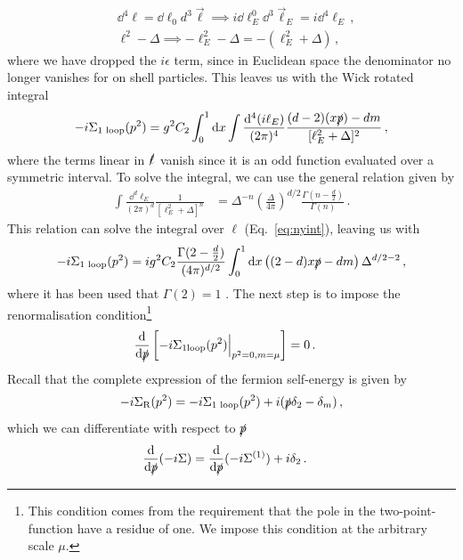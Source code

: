 \begin{align}
    &\dd^4\ell = \dd\ell_0 d^3\vec{\ell} \implies i \dd\ell_E^0 \dd^3\vec{\ell}_E = i \dd^4\ell_E\,,\\
    &\ell^2 - \Delta \implies -\ell_E^2 - \Delta = -(\ell_E^2 + \Delta) \,,
\end{align}
where we have dropped the $i\epsilon$ term, since in Euclidean space the denominator no longer vanishes for on shell particles. This leaves us with the Wick rotated integral
\begin{align}
    -i \Sigma_{\text{1 loop}}(p^2)= g^2 C_2 \int_0^1 \mathrm{d} x \int \frac{\mathrm{d}^4(i\ell_E)}{(2\pi)^4} \frac{(d-2)(x\slashed{p}) - dm}{[\ell_E^2 + \Delta]^2}\,,\label{eq:nyint}
\end{align}
where the terms linear in $\slashed{\ell}$ vanish since it is an odd function evaluated over a symmetric interval. To solve the integral, we can use the general relation \cite{Peskin:1995ev} given by
\begin{align}
    \int \frac{\dd^d \ell_E}{(2\pi)^d} \frac{1}{[\ell_E^2 + \Delta]^n} &= \Delta^{-n} \left(\frac{\Delta}{4\pi}\right)^{d/2} \frac{\Gamma(n - \frac{d}{2})}{\Gamma(n)}\,.
\end{align}
This relation can solve the integral over $\ell$ (Eq.~\eqref{eq:nyint}), leaving us with
\begin{align}
    -i \Sigma_{\text{1 loop}}(p^2)= i g^2 C_2 \frac{\Gamma(2 - \frac{d}{2})}{(4\pi)^{d/2}} \int_0^1 \mathrm{d} x \left( (2-d)x\slashed{p} - dm \right) \Delta^{d/2 - 2}\,,\label{eq:int3}
\end{align}
where it has been used that  $\Gamma(2) = 1$ \cite{Peskin:1995ev}. The next step is to impose the renormalisation condition\footnote{This condition comes from the requirement that the pole in the two-point-function have a residue of one. We impose this condition at the arbitrary scale $\mu$.}
\begin{align}
    \frac{\mathrm{d}}{\mathrm{d}\slashed{p}} \left[ -i \Sigma_{\text{1loop}} (p^2) \Big|_{p^2=0, m=\mu} \right] &= 0\,.\label{eq:con}
\end{align}
Recall that the complete expression of the fermion self-energy is given by 
\begin{align}
    -i \Sigma_{\text{R}}(p^2)=-i \Sigma_{\text{1 loop}}(p^2)+i(\slashed{p}\delta_2-\delta_m)\,,
\end{align}
which we can differentiate with respect to $\slashed{p}$
\begin{align}
    \frac{\mathrm{d}}{\mathrm{d}\slashed{p}} (-i \Sigma) &= \frac{\mathrm{d}}{\mathrm{d}\slashed{p}} (-i \Sigma^{(1)}) + i \delta_2\,.
\end{align}
